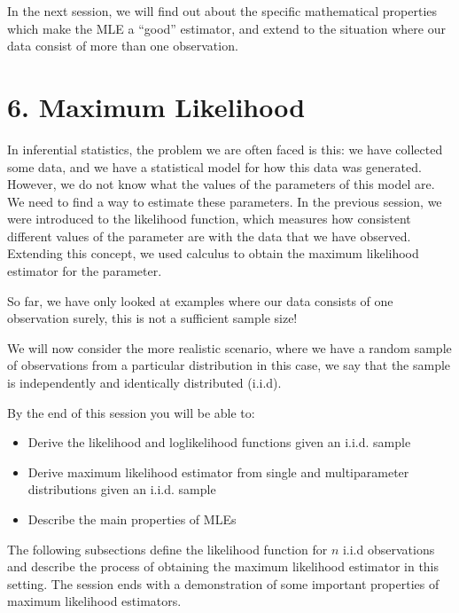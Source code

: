 \documentclass[letterpaper,10pt,english]{jupyterBook}
\begin{document}
\sphinxAtStartPar
In the next session, we will find out about the specific mathematical properties which make the MLE a “good” estimator, and extend to the situation where our data consist of more than one observation.


\chapter{6. Maximum Likelihood}
\label{\detokenize{06.a. Maximum Likelihood:maximum-likelihood}}\label{\detokenize{06.a. Maximum Likelihood::doc}}
\sphinxAtStartPar
In inferential statistics, the problem we are often faced is this: we have collected some data, and we have a statistical model for how this data was generated. However, we do not know what the values of the parameters of this model are. We need to find a way to estimate these parameters. In the previous session, we were introduced to the likelihood function, which measures how consistent different values of the parameter are with the data that we have observed. Extending this concept, we used calculus to obtain the maximum likelihood estimator for the parameter.

\sphinxAtStartPar
So far, we have only looked at examples where our data consists of one observation \sphinxhyphen{} surely, this is not a sufficient sample size!

\sphinxAtStartPar
We will now consider the more realistic scenario, where we have a random sample of observations from a particular distribution \sphinxhyphen{} in this case, we say that the sample is independently and identically distributed (i.i.d).



\sphinxAtStartPar
By the end of this session you will be able to:
\begin{itemize}
\item {} 
\sphinxAtStartPar
Derive the likelihood and log\sphinxhyphen{}likelihood functions given an i.i.d. sample

\item {} 
\sphinxAtStartPar
Derive maximum likelihood estimator from single and multi\sphinxhyphen{}parameter distributions given an i.i.d. sample

\item {} 
\sphinxAtStartPar
Describe the main properties of MLEs

\end{itemize}



\sphinxAtStartPar
The following subsections define the likelihood function for \(n\) i.i.d observations and describe the process of obtaining the maximum likelihood estimator in this setting. The session ends with a demonstration of some important properties of maximum likelihood estimators.
\end{document}
